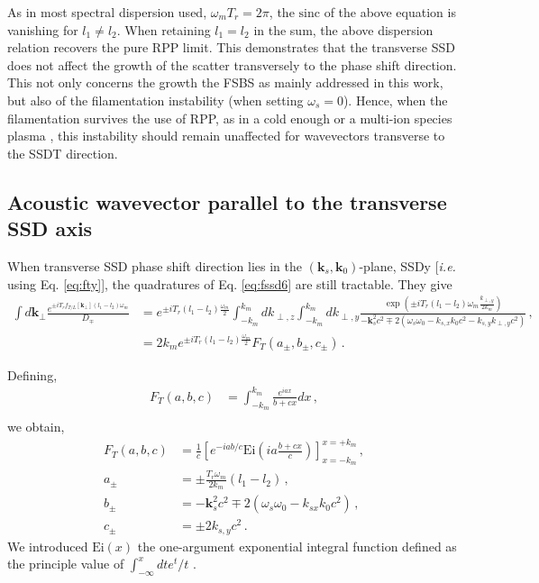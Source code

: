 \documentclass[
 reprint,
 amsmath,amssymb,
 aps,
]{revtex4-1}
\begin{document}
\begin{widetext}
As in most spectral dispersion used, $\omega_mT_r = 2\pi $, the $\mathrm{sinc}$ of the above equation is vanishing for  $l_1\neq l_2$. When retaining $l_1=l_2$ in the sum, the above dispersion relation recovers the pure RPP limit. This demonstrates that the transverse SSD does not affect the growth of the  scatter  transversely to the phase shift direction. This not only concerns the growth the FSBS as mainly  addressed in this work, but also of the filamentation instability (when setting $\omega_s=0$). Hence, when the filamentation survives the use of RPP, as in a cold enough   or a multi-ion species plasma \cite[]{POP_Ruyer_2021}, this instability should remain unaffected for wavevectors transverse to the SSDT direction.

\subsection{Acoustic wavevector parallel to the transverse SSD axis}\label{sec:ssdty}
When transverse SSD phase shift direction lies in the $(\mathbf{k}_s,\mathbf{k}_0)$-plane, SSDy [\emph{i.e.} using Eq. \eqref{eq:fty}], the quadratures of Eq. \eqref{eq:fssd6} are still tractable. They give
\begin{align}
 \int d\mathbf{k}_\perp 
     \frac{  e^{ \pm  iT_{r}f_{T/L}[\mathbf{k}_\perp]  (l_1-l_2) \omega_m }
     }{D_\mp}&=  e^{\pm iT_{r} (l_1-l_2)\frac{ \omega_m}{2} }
      \int_{-k_m}^{k_m} dk_{\perp,z} \int_{-k_m}^{k_m} dk_{\perp,y}\frac{  \exp\left( \pm  iT_{r}  (l_1-l_2)\omega_m \frac{k_{\perp,y}}{2k_m}  \right)
     }{- \mathbf{k}_s^2c^2 \mp 2(\omega_s\omega_{0} - k_{s,x}   k_0 c^2 - k_{s,y} k_{\perp,y} c^2) }
   \, ,\label{eq:int1}  \nonumber \\
   &=2k_m e^{\pm iT_{r} (l_1-l_2)\frac{ \omega_m}{2} } F_T(a_\pm,b_\pm,c_\pm) \, .
\end{align}

Defining,
\begin{align}
    F_T(a,b,c)&= \int_{-k_m}^{k_m} \frac{e^{iax}}{b+cx}dx\, ,\\
\end{align}
we obtain,
\begin{align}
     F_T(a,b,c) &  = \frac{1}{c}\left[
    e^{-iab/c}\mathrm{Ei}\left(ia\frac{b+cx}{c}\right)
    \right]_{x=-k_m}^{x=+k_m}\, ,\label{eq:fabc}\\
    a_\pm&=\pm\frac{T_r\omega_m}{2k_m}(l_1-l_2)\, ,\label{eq:fa}\\
    b_\pm&=- \mathbf{k}_s^2c^2 \mp 2( \omega_s\omega_{0}-k_{sx}k_0c^2 )\, ,\label{eq:fb} \\
    c_\pm&=\pm 2 k_{s,y}c^2\, .\label{eq:fc}
\end{align}
We introduced $\mathrm{Ei}(x)$ the one-argument exponential integral function defined as the principle value of $\int_{-\infty}^x dt e^{t}/t$ \cite[]{Abramowitz}. 


\end{widetext}
\end{document}

